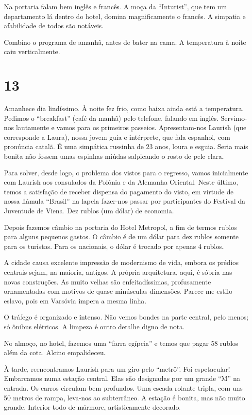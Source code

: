 Na portaria falam bem inglês e francês. A moça da ``Inturist'', que tem um departamento lá dentro do hotel, domina magnificamente o francês. A simpatia e afabilidade de todos são notáveis.

Combino o programa de amanhã, antes de bater na cama. A temperatura à noite caiu verticalmente.

\section*{13 \adfflatleafright {}}
Amanhece dia lindíssimo. À noite fez frio, como baixa ainda está a temperatura. Pedimos o ``breakfast'' (café da manhã) pelo telefone, falando em inglês. Servimo-nos lautamente e vamos para os primeiros passeios. Apresentam-nos Laurish (que corresponde a Laura), nossa jovem guia e intérprete, que fala espanhol, com pronúncia catalã. É uma simpática russinha de 23 anos, loura e esguia. Seria mais bonita não fossem umas espinhas miúdas salpicando o rosto de pele clara.

Para solver, desde logo, o problema dos vistos para o regresso, vamos inicialmente com Laurish aos consulados da Polônia e da Alemanha Oriental. Neste último, temos a satisfação de receber dispensa do pagamento do visto, em virtude de nossa flâmula ``Brasil'' na lapela fazer-nos passar por participantes do Festival da Juventude de Viena. Dez rublos (um dólar) de economia.

Depois fazemos câmbio na portaria do Hotel Metropol, a fim de termos rublos para alguns pequenos gastos. O câmbio é de um dólar para dez rublos somente para os turistas. Para os nacionais, o dólar é trocado por apenas 4 rublos.

A cidade causa excelente impressão de modernismo de vida, embora os prédios centrais sejam, na maioria, antigos. A própria arquitetura, aqui, é sóbria nas novas construções. As muito velhas são enfeitadíssimas, profusamente ornamentadas com motivos de quase minúsculas dimensões. Parece-me estilo eslavo, pois em Varsóvia impera a mesma linha.

O tráfego é organizado e intenso. Não vemos bondes na parte central, pelo menos; só ônibus elétricos. A limpeza é outro detalhe digno de nota.

No almoço, no hotel, fazemos uma ``farra egípcia'' e temos que pagar 58 rublos além da cota. Alcino empalideceu.

À tarde, reencontramos Laurish para um giro pelo ``metrô''. Foi espetacular! Embarcamos numa estação central. Elas são designadas por um grande ``M'' na entrada. Os carros circulam bem profundos. Uma escada rolante tripla, com uns 50 metros de rampa, leva-nos ao subterrâneo. A estação é bonita, mas não muito grande. Interior todo de mármore, artisticamente decorado.

